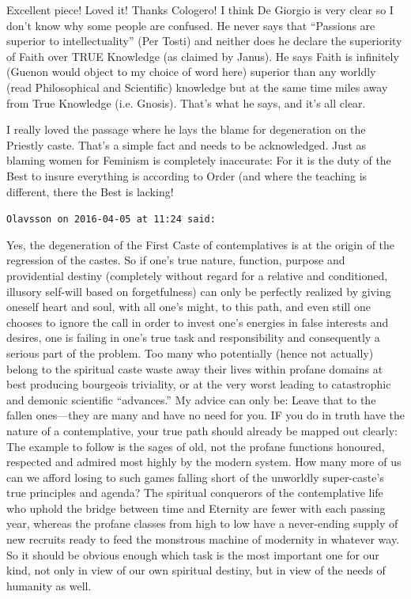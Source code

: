 \begin{footnotesize}
\begin{sffamily}
Excellent piece! Loved it! Thanks Cologero! I think De Giorgio is very clear so I don't know why some people are confused. He never says that ``Passions are superior to intellectuality'' (Per Tosti) and neither does he declare the superiority of Faith over TRUE Knowledge (as claimed by Janus). He says Faith is infinitely (Guenon would object to my choice of word here) superior than any worldly (read Philosophical and Scientific) knowledge but at the same time miles away from True Knowledge (i.e. Gnosis). That's what he says, and it's all clear.

I really loved the passage where he lays the blame for degeneration on the Priestly caste. That's a simple fact and needs to be acknowledged. Just as blaming women for Feminism is completely inaccurate: For it is the duty of the Best to insure everything is according to Order (and where the teaching is different, there the Best is lacking!

\hfill

\texttt{Olavsson on 2016-04-05 at 11:24 said:}

Yes, the degeneration of the First Caste of contemplatives is at the origin of the regression of the castes. So if one's true nature, function, purpose and providential destiny (completely without regard for a relative and conditioned, illusory self-will based on forgetfulness) can only be perfectly realized by giving oneself heart and soul, with all one's might, to this path, and even still one chooses to ignore the call in order to invest one's energies in false interests and desires, one is failing in one's true task and responsibility and consequently a serious part of the problem. Too many who potentially (hence not actually) belong to the spiritual caste waste away their lives within profane domains at best producing bourgeois triviality, or at the very worst leading to catastrophic and demonic scientific ``advances.'' My advice can only be: Leave that to the fallen ones---they are many and have no need for you. IF you do in truth have the nature of a contemplative, your true path should already be mapped out clearly: The example to follow is the sages of old, not the profane functions honoured, respected and admired most highly by the modern system. How many more of us can we afford losing to such games falling short of the unworldly super-caste's true principles and agenda? The spiritual conquerors of the contemplative life who uphold the bridge between time and Eternity are fewer with each passing year, whereas the profane classes from high to low have a never-ending supply of new recruits ready to feed the monstrous machine of modernity in whatever way. So it should be obvious enough which task is the most important one for our kind, not only in view of our own spiritual destiny, but in view of the needs of humanity as well.


\end{sffamily}
\end{footnotesize}
